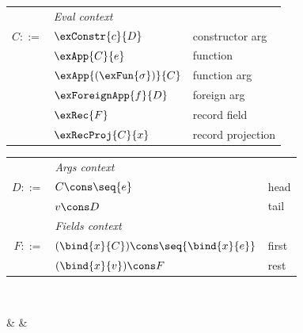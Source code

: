 \begin{figure}
   \small
   \begin{minipage}[t]{0.48\textwidth}
      \begin{tabularx}{\textwidth}{rL{2.5cm}L{3.6cm}}
         &\textit{Eval context}&
         \\
         $C ::=$
         &
         $\exConstr{c}{D}$
         &
         constructor arg
         \\
         &
         $\exApp{C}{e}$
         &
         function
         \\
         &
         $\exApp{(\exFun{\sigma})}{C}$
         &
         function arg
         \\
         &
         $\exForeignApp{f}{D}$
         &
         foreign arg
         \\
         &
         $\exRec{F}$
         &
         record field
         \\
         &
         $\exRecProj{C}{x}$
         &
         record projection
      \end{tabularx}
   \end{minipage}%
   \begin{minipage}[t]{0.48\textwidth}
      \begin{tabularx}{\textwidth}{rL{2.5cm}L{3.6cm}}
         &\textit{Args context}&
         \\
         $D ::=$
         &
         $C \cons \seq{e}$
         &
         head
         \\
         &
         $v \cons D$
         &
         tail
         \\[2mm]
         &\textit{Fields context}&
         \\
         $F ::=$
         &
         $(\bind{x}{C}) \cons \seq{\bind{x}{e}}$
         &
         first
         \\
         &
         $(\bind{x}{v}) \cons F$
         &
         rest
         \\[3mm]
      \end{tabularx}
   \end{minipage}
   \\[3mm]
   {\small \flushleft {}}%
   \begin{salign}
      & \geval
      \alpha
      &
      \\

\end{salign}
\end{figure}

